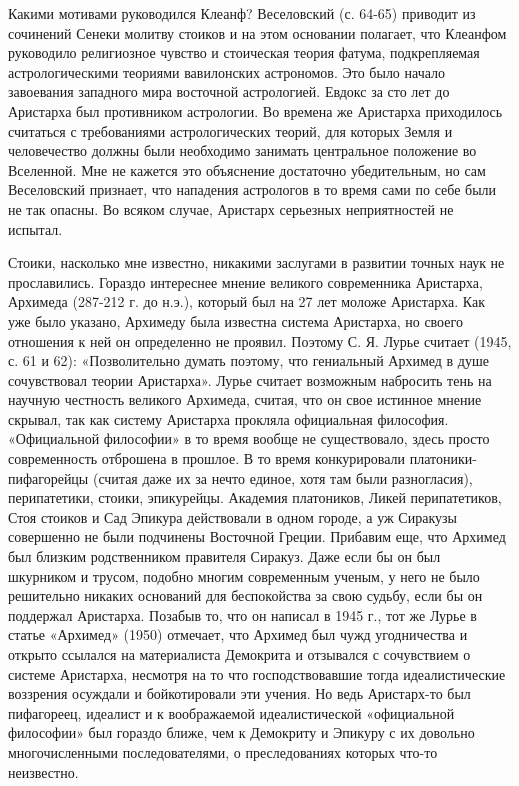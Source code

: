 Какими мотивами руководился Клеанф? Веселовский (с. 64-65) приводит из
сочинений Сенеки молитву стоиков и на этом основании полагает, что
Клеанфом руководило религиозное чувство и стоическая теория фатума,
подкрепляемая астрологическими теориями вавилонских астрономов. Это
было начало завоевания западного мира восточной астрологией. Евдокс за
сто лет до Аристарха был противником астрологии. Во времена же
Аристарха приходилось считаться с требованиями астрологических теорий,
для которых Земля и человечество должны были необходимо занимать
центральное положение во Вселенной. Мне не кажется это объяснение
достаточно убедительным, но сам Веселовский признает, что нападения
астрологов в то время сами по себе были не так опасны. Во всяком
случае, Аристарх серьезных неприятностей не испытал.

Стоики, насколько мне известно, никакими заслугами в развитии точных
наук не прославились. Гораздо интереснее мнение великого современника
Аристарха, Архимеда (287-212 г. до н.э.), который был на 27 лет
моложе Аристарха. Как уже было указано, Архимеду была известна система
Аристарха, но своего отношения к ней он определенно не проявил.
Поэтому С. Я. Лурье считает (1945, с. 61 и 62): «Позволительно думать
поэтому, что гениальный Архимед в душе сочувствовал теории Аристарха».
Лурье считает возможным набросить тень на научную честность великого
Архимеда, считая, что он свое истинное мнение скрывал, так как систему
Аристарха прокляла официальная философия. «Официальной философии» в то
время вообще не существовало, здесь просто современность отброшена в
прошлое. В то время конкурировали платоники-пифагорейцы (считая даже
их за нечто единое, хотя там были разногласия), перипатетики, стоики,
эпикурейцы. Академия платоников, Ликей перипатетиков, Стоя стоиков и
Сад Эпикура действовали в одном городе, а уж Сиракузы совершенно не
были подчинены Восточной Греции. Прибавим еще, что Архимед был близким
родственником правителя Сиракуз. Даже если бы он был шкурником и
трусом, подобно многим современным ученым, у него не было решительно
никаких оснований для беспокойства за свою судьбу, если бы он
поддержал Аристарха. Позабыв то, что он написал в 1945 г., тот же
Лурье в статье «Архимед» (1950) отмечает, что Архимед был чужд
угодничества и открыто ссылался на материалиста Демокрита и отзывался
с сочувствием о системе Аристарха, несмотря на то что господствовавшие
тогда идеалистические воззрения осуждали и бойкотировали эти учения.
Но ведь Аристарх-то был пифагореец, идеалист и к воображаемой
идеалистической «официальной философии» был гораздо ближе, чем к
Демокриту и Эпикуру с их довольно многочисленными последователями, о
преследованиях которых что-то неизвестно.

